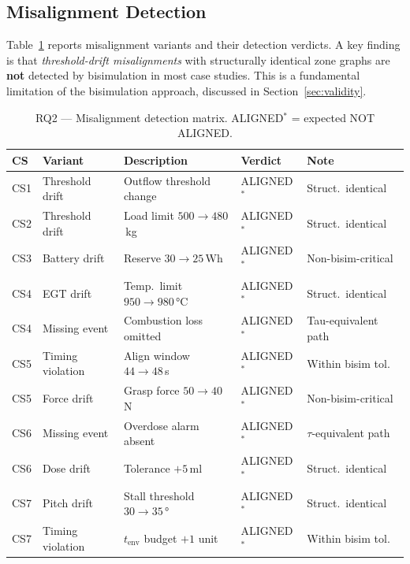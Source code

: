 \documentclass[10pt,a4paper]{article}
\newcommand{\WARN}[1]{\textcolor{warnred}{#1}}
\begin{document}
\subsection{Misalignment Detection}

Table~\ref{tab:rq2_detect} reports misalignment variants and their detection
verdicts. A key finding is that \emph{threshold-drift misalignments} with
structurally identical zone graphs are \textbf{not} detected by bisimulation
in most case studies. This is a fundamental limitation of the bisimulation
approach, discussed in Section~\ref{sec:validity}.

\begin{table}[htbp]
\centering
\caption{RQ2 — Misalignment detection matrix. \WARN{ALIGNED${}^*$} = expected NOT ALIGNED.}
\label{tab:rq2_detect}
\small
\begin{tabular}{@{}lllll@{}}
\toprule
\textbf{CS} & \textbf{Variant} & \textbf{Description} & \textbf{Verdict} & \textbf{Note} \\
\midrule
CS1  & Threshold drift  & Outflow threshold change              & \WARN{ALIGNED${}^*$} & Struct.\ identical \\
CS2  & Threshold drift  & Load limit $500 \to 480$\,kg          & \WARN{ALIGNED${}^*$} & Struct.\ identical \\
CS3  & Battery drift    & Reserve $30 \to 25$\,Wh               & \WARN{ALIGNED${}^*$} & Non-bisim-critical \\
CS4  & EGT drift        & Temp.\ limit $950 \to 980$\,°C        & \WARN{ALIGNED${}^*$} & Struct.\ identical \\
CS4  & Missing event    & Combustion loss omitted               & \WARN{ALIGNED${}^*$} & Tau-equivalent path \\
CS5  & Timing violation & Align window $44 \to 48$\,s           & \WARN{ALIGNED${}^*$} & Within bisim tol. \\
CS5  & Force drift      & Grasp force $50 \to 40$\,N             & \WARN{ALIGNED${}^*$} & Non-bisim-critical \\
CS6  & Missing event    & Overdose alarm absent                 & \WARN{ALIGNED${}^*$} & $\tau$-equivalent path \\
CS6  & Dose drift       & Tolerance $+5$\,ml                    & \WARN{ALIGNED${}^*$} & Struct.\ identical \\
CS7  & Pitch drift      & Stall threshold $30 \to 35$\,°        & \WARN{ALIGNED${}^*$} & Struct.\ identical \\
CS7  & Timing violation & $t_\text{env}$ budget $+1$ unit       & \WARN{ALIGNED${}^*$} & Within bisim tol. \\

\end{tabular}
\end{table}
\end{document}
